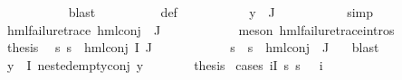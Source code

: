 \begin{isabellebody}
\ \ \ \ \ \ \ \ \ \isamarkupfalse%
\ blast\isanewline
\ \ \ \ \ \ \ \ \isamarkupfalse%
\ {\isasymPsi}{\isacharunderscore}{\kern0pt}def\ \isanewline
\ \ \ \ \ \ \ \ \isamarkupfalse%
\ {\isacartoucheopen}y\ {\isasymin}\ {\isasymPhi}{\isacharbackquote}{\kern0pt}J{\isacartoucheclose}\ \isanewline
\ \ \ \ \ \ \ \ \isamarkupfalse%
\ simp\isanewline
\ \ \ \ \ \ \isamarkupfalse%
\ {\isachardoublequoteopen}hml{\isacharunderscore}{\kern0pt}failure{\isacharunderscore}{\kern0pt}trace\ {\isacharparenleft}{\kern0pt}hml{\isacharunderscore}{\kern0pt}conj\ {\isacharbraceleft}{\kern0pt}{\isacharbraceright}{\kern0pt}\ J\ {\isasymPsi}{\isacharparenright}{\kern0pt}{\isachardoublequoteclose}\ \isanewline
\ \ \ \ \ \ \ \ \isamarkupfalse%
\ {\isacharparenleft}{\kern0pt}meson\ hml{\isacharunderscore}{\kern0pt}failure{\isacharunderscore}{\kern0pt}trace{\isachardot}{\kern0pt}intros{\isacharparenleft}{\kern0pt}{}{\isacharparenright}{\kern0pt}{\isacharparenright}{\kern0pt}\isanewline
\ \ \ \ \ \ \isamarkupfalse%
\ \isamarkupfalse%
\ {\isacharquery}{\kern0pt}thesis\ \isamarkupfalse%
\ {\isacartoucheopen}{\isasymforall}s{\isachardot}{\kern0pt}\ {\isasymnot}s\ {\isasymTurnstile}\ {\isacharparenleft}{\kern0pt}hml{\isacharunderscore}{\kern0pt}conj\ I\ J\ {\isasymPhi}{\isacharparenright}{\kern0pt}{\isacartoucheclose}\ \isanewline
\ \ \ \ \ \ \ \ \isamarkupfalse%
\ {\isacartoucheopen}{\isasymforall}s{\isachardot}{\kern0pt}\ {\isasymnot}\ s\ {\isasymTurnstile}\ hml{\isacharunderscore}{\kern0pt}conj\ {\isacharbraceleft}{\kern0pt}{\isacharbraceright}{\kern0pt}\ J\ {\isasymPsi}{\isacartoucheclose}\ \isamarkupfalse%
\ blast\isanewline
\ \ \ \ \isamarkupfalse%
\isanewline
\ \ \isamarkupfalse%
\isanewline
{}\isamarkupfalse%
\isanewline
\ \ \ \ \isamarkupfalse%
\ {\isachardoublequoteopen}{\isasymforall}y{\isasymin}{\isasymPhi}\ {\isacharbackquote}{\kern0pt}\ I{\isachardot}{\kern0pt}\ nested{\isacharunderscore}{\kern0pt}empty{\isacharunderscore}{\kern0pt}conj\ y{\isachardoublequoteclose}\isanewline
\ \ \ \ \isamarkupfalse%
\ \isamarkupfalse%
\ {\isacharquery}{\kern0pt}thesis\ \isamarkupfalse%
{\isacharparenleft}{\kern0pt}cases\ {\isachardoublequoteopen}{\isasymexists}i{\isasymin}I{\isachardot}{\kern0pt}\ {\isacharparenleft}{\kern0pt}{\isasymforall}s{\isachardot}{\kern0pt}\ {\isacharparenleft}{\kern0pt}{\isasymnot}{\isacharparenleft}{\kern0pt}s\ {\isasymTurnstile}\ {\isacharparenleft}{\kern0pt}{\isasymPhi}\ i{\isacharparenright}{\kern0pt}{\isacharparenright}{\kern0pt}{\isacharparenright}{\kern0pt}{\isacharparenright}{\kern0pt}{\isachardoublequoteclose}{\isacharparenright}{\kern0pt}\isanewline

\end{isabellebody}
